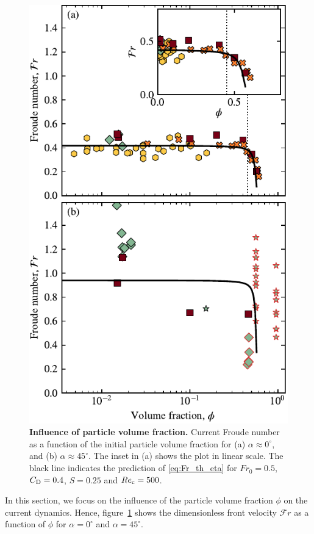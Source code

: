 \documentclass[12pt]{article}
\begin{document}
\begin{figure}
	\centering
	\includegraphics{figure6.pdf}
	\caption{\textbf{Influence of particle volume fraction.} Current Froude number as a function of the initial particle volume fraction for (a) $\alpha \approx 0^\circ$, and (b) $\alpha \approx 45^\circ$. The inset in (a) shows the plot in linear scale. The black line indicates the prediction of \eqref{eq:Fr_th_eta} for $Fr_{0} = 0.5$, $C_{\text D} = 0.4$, $S = 0.25$ and $Re_{\text c} = 500$.}
	\label{fig:fig6}
\end{figure}

In this section, we focus on the influence of the particle volume fraction $\phi$ on the current dynamics. Hence, figure~\ref{fig:fig6} shows the dimensionless front velocity $\mathcal{F}r$ as a function of $\phi$ for $\alpha=0^\circ$ and $\alpha=45^\circ$.
\end{document}
